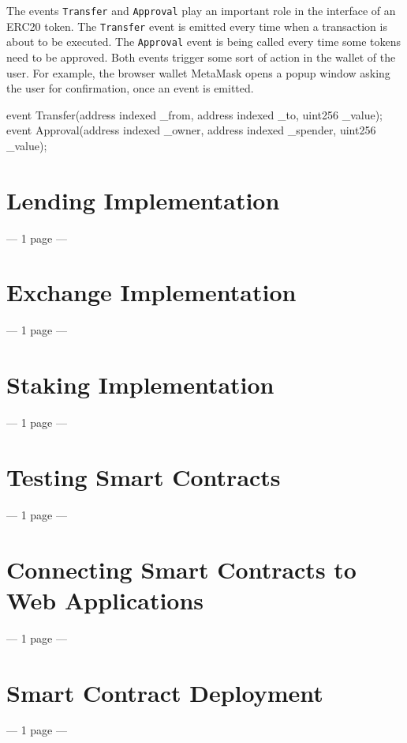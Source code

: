 The events \texttt{Transfer} and \texttt{Approval} play an important role in the interface of an ERC20 token. The \texttt{Transfer} event is emitted every time when a transaction is about to be executed. The \texttt{Approval} event is being called every time some tokens need to be approved. Both events trigger some sort of action in the wallet of the user. For example, the browser wallet MetaMask opens a popup window asking the user for confirmation, once an event is emitted. 
\begin{GenericCode}
event Transfer(address indexed _from, address indexed _to, uint256 _value);
event Approval(address indexed _owner, address indexed _spender, uint256 _value);
\end{GenericCode}

\section{Lending Implementation}
--- 1 page ---

\section{Exchange Implementation}
--- 1 page ---

\section{Staking Implementation}
--- 1 page ---

\section{Testing Smart Contracts}
--- 1 page ---

\section{Connecting Smart Contracts to Web Applications}
--- 1 page ---

\section{Smart Contract Deployment}
--- 1 page ---
